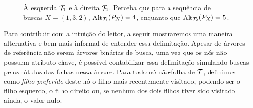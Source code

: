 \begin{figure}
    \hspace{1cm}
    \caption{À esquerda $\mathcal{T}_1$ e à direita $\mathcal{T}_2$. Perceba que para a sequência de buscas $X = (1,3,2)$, Alt$_{\mathcal{T}_1}(P_X) = 4$, enquanto que Alt$_{\mathcal{T}_2}(P_X) = 5$.}
\label{fig:alternancia_diferente}
\end{figure}


Para contribuir com a intuição do leitor, a seguir mostraremos uma maneira alternativa e bem mais informal de entender essa delimitação. Apesar de árvores de referência não serem árvores binárias de busca, uma vez que os nós não possuem atributo chave, é possível contabilizar essa delimitação simulando buscas pelos rótulos das folhas nessa árvore. Para todo nó não-folha de $\mathcal{T}$, definimos como \textit{filho preferido} deste nó o filho mais recentemente visitado, podendo ser o filho esquerdo, o filho direito ou, se nenhum dos dois filhos tiver sido visitado ainda, o valor nulo.


